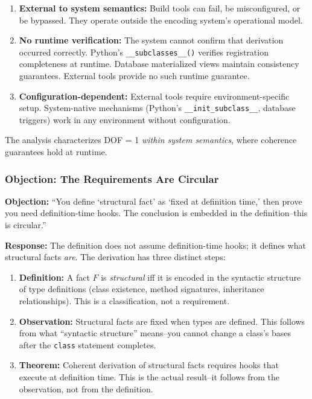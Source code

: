 \begin{enumerate}
\item \textbf{External to system semantics:} Build tools can fail, be misconfigured, or be bypassed. They operate outside the encoding system's operational model.

\item \textbf{No runtime verification:} The system cannot confirm that derivation occurred correctly. Python's \texttt{\_\_subclasses\_\_()} verifies registration completeness at runtime. Database materialized views maintain consistency guarantees. External tools provide no such runtime guarantee.

\item \textbf{Configuration-dependent:} External tools require environment-specific setup. System-native mechanisms (Python's \texttt{\_\_init\_subclass\_\_}, database triggers) work in any environment without configuration.
\end{enumerate}

The analysis characterizes DOF = 1 \emph{within system semantics}, where coherence guarantees hold at runtime.

\subsubsection{Objection: The Requirements Are Circular}

\textbf{Objection:} ``You define `structural fact' as `fixed at definition time,' then prove you need definition-time hooks. The conclusion is embedded in the definition--this is circular.''

\textbf{Response:} The definition does not assume definition-time hooks; it defines what structural facts \emph{are}. The derivation has three distinct steps:

\begin{enumerate}
\item \textbf{Definition:} A fact $F$ is \emph{structural} iff it is encoded in the syntactic structure of type definitions (class existence, method signatures, inheritance relationships). This is a classification, not a requirement.

\item \textbf{Observation:} Structural facts are fixed when types are defined. This follows from what ``syntactic structure'' means--you cannot change a class's bases after the \texttt{class} statement completes.

\item \textbf{Theorem:} Coherent derivation of structural facts requires hooks that execute at definition time. This is the actual result--it follows from the observation, not from the definition.
\end{enumerate}


